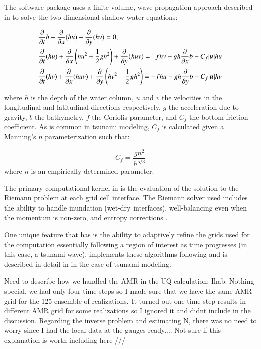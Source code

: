 \subsection{\geoclaw} \label{ssub:geoclaw}

The \geoclaw software package uses a finite volume, wave-propagation approach described in \cite{LeVeque:1997eg} to solve the two-dimensional shallow water equations:

\begin{equation} \label{eq:swe}
    \begin{aligned}
    &\pd{}{t} h + \pd{}{x} (hu) + \pd{}{y} (hv) = 0, \\
    &\pd{}{t}(hu) + \pd{}{x} \left(hu^2 + \frac{1}{2} g h^2 \right ) + \pd{}{y} (huv) = ~~ fhv - gh \pd{}{x} b - C_f |\vec{u}| hu \\
    &\pd{}{t} (hv) + \pd{}{x} (huv) + \pd{}{y} \left (hv^2 + \frac{1}{2} gh^2 \right) = -fhu - gh \pd{}{y} b - C_f |\vec{u}| hv
    \end{aligned}
\end{equation}

where $h$ is the depth of the water column, $u$ and $v$ the velocities in the 
longitudinal and latitudinal directions respectively, $g$ the acceleration due 
to gravity, $b$ the bathymetry, $f$ the Coriolis parameter, and $C_f$ the bottom 
friction coefficient.  As is common in tsunami modeling, $C_f$ is calculated 
given a Manning's $n$ parameterization such that:

\begin{equation}
    C_f = \frac{g n^2}{h^{5/3}}
\end{equation}
where $n$ is an empirically determined parameter.  

The primary computational kernel in \geoclaw is the evaluation of the solution to the Riemann problem at each grid cell interface.  The Riemann solver used includes the ability to handle inundation (wet-dry interfaces), well-balancing even when the momentum is non-zero, and entropy corrections \cite{George:2008aa}.

One unique feature that \geoclaw has is the ability to adaptively refine the grids used for the computation essentially following a region of interest as time progresses (in this case, a tsunami wave).  \geoclaw implements these algorithms following \cite{Berger:1984ui,Berger:1998aa} and is described in detail in \cite{Berger:2011du} in the case of tsunami modeling.

\alert{Need to describe how we handled the AMR in the UQ calculation: Ihab: Nothing special, we had only four time
steps so I made sure that we have the same AMR grid for the 125 ensemble of realizations. It turned out
one time step results in different AMR grid for some realizations so I ignored it and didnt include in the discussion.
Regarding the inverse problem and estimating N, there was no need to worry since I had the local data
at the gauges ready.... Not sure if this explanation is worth including here ///}

